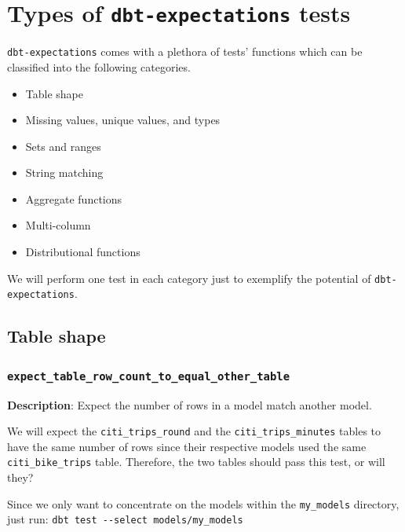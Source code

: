 \documentclass[
]{book}
\providecommand{\tightlist}{%
  \setlength{\itemsep}{0pt}\setlength{\parskip}{0pt}}
\begin{document}
\hypertarget{types-of-dbt-expectations-tests}{%
\section{\texorpdfstring{Types of \texttt{dbt-expectations} tests}{Types of dbt-expectations tests}}\label{types-of-dbt-expectations-tests}}

\texttt{dbt-expectations} comes with a plethora of tests' functions which can be classified into the following categories.

\begin{itemize}
\tightlist
\item
  Table shape
\item
  Missing values, unique values, and types
\item
  Sets and ranges
\item
  String matching
\item
  Aggregate functions
\item
  Multi-column
\item
  Distributional functions
\end{itemize}

We will perform one test in each category just to exemplify the potential of \texttt{dbt-expectations}.

\hypertarget{table-shape}{%
\subsection{Table shape}\label{table-shape}}

\hypertarget{expect_table_row_count_to_equal_other_table}{%
\subsubsection{\texorpdfstring{\texttt{expect\_table\_row\_count\_to\_equal\_other\_table}}{expect\_table\_row\_count\_to\_equal\_other\_table}}\label{expect_table_row_count_to_equal_other_table}}

\textbf{Description}: Expect the number of rows in a model match another model.

We will expect the \texttt{citi\_trips\_round} and the \texttt{citi\_trips\_minutes} tables to have the same number of rows since their respective models used the same \texttt{citi\_bike\_trips} table. Therefore, the two tables should pass this test, or will they?

Since we only want to concentrate on the models within the \texttt{my\_models} directory, just run: \texttt{dbt\ test\ -\/-select\ models/my\_models}
\end{document}
